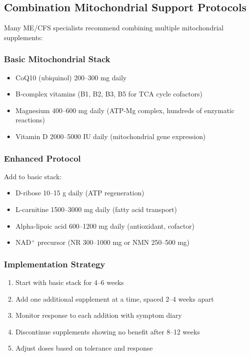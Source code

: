 \subsection{Combination Mitochondrial Support Protocols}

Many ME/CFS specialists recommend combining multiple mitochondrial supplements:

\subsubsection{Basic Mitochondrial Stack}

\begin{itemize}
    \item CoQ10 (ubiquinol) 200--300 mg daily
    \item B-complex vitamins (B1, B2, B3, B5 for TCA cycle cofactors)
    \item Magnesium 400--600 mg daily (ATP-Mg complex, hundreds of enzymatic reactions)
    \item Vitamin D 2000--5000 IU daily (mitochondrial gene expression)
\end{itemize}

\subsubsection{Enhanced Protocol}

Add to basic stack:
\begin{itemize}
    \item D-ribose 10--15 g daily (ATP regeneration)
    \item L-carnitine 1500--3000 mg daily (fatty acid transport)
    \item Alpha-lipoic acid 600--1200 mg daily (antioxidant, cofactor)
    \item NAD$^+$ precursor (NR 300--1000 mg or NMN 250--500 mg)
\end{itemize}

\subsubsection{Implementation Strategy}

\begin{enumerate}
    \item Start with basic stack for 4--6 weeks
    \item Add one additional supplement at a time, spaced 2--4 weeks apart
    \item Monitor response to each addition with symptom diary
    \item Discontinue supplements showing no benefit after 8--12 weeks
    \item Adjust doses based on tolerance and response
\end{enumerate}

